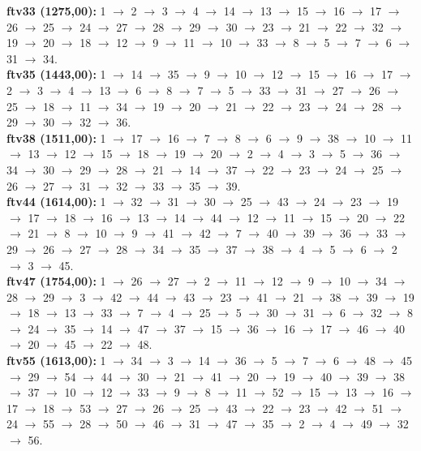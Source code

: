 \documentclass[10pt,a4paper]{article}
\begin{document}
\textbf{ftv33 (1275,00):} 1 $\to$ 2 $\to$ 3 $\to$ 4 $\to$ 14 $\to$ 13 $\to$ 15 $\to$ 16 $\to$ 17 $\to$ 26 $\to$ 25 $\to$ 24 $\to$ 27 $\to$ 28 $\to$ 29 $\to$ 30 $\to$ 23 $\to$ 21 $\to$ 22 $\to$ 32 $\to$ 19 $\to$ 20 $\to$ 18 $\to$ 12 $\to$ 9 $\to$ 11 $\to$ 10 $\to$ 33 $\to$ 8 $\to$ 5 $\to$ 7 $\to$ 6 $\to$ 31 $\to$ 34. \\
\textbf{ftv35 (1443,00):} 1 $\to$ 14 $\to$ 35 $\to$ 9 $\to$ 10 $\to$ 12 $\to$ 15 $\to$ 16 $\to$ 17 $\to$ 2 $\to$ 3 $\to$ 4 $\to$ 13 $\to$ 6 $\to$ 8 $\to$ 7 $\to$ 5 $\to$ 33 $\to$ 31 $\to$ 27 $\to$ 26 $\to$ 25 $\to$ 18 $\to$ 11 $\to$ 34 $\to$ 19 $\to$ 20 $\to$ 21 $\to$ 22 $\to$ 23 $\to$ 24 $\to$ 28 $\to$ 29 $\to$ 30 $\to$ 32 $\to$ 36. \\
\textbf{ftv38 (1511,00):} 1 $\to$ 17 $\to$ 16 $\to$ 7 $\to$ 8 $\to$ 6 $\to$ 9 $\to$ 38 $\to$ 10 $\to$ 11 $\to$ 13 $\to$ 12 $\to$ 15 $\to$ 18 $\to$ 19 $\to$ 20 $\to$ 2 $\to$ 4 $\to$ 3 $\to$ 5 $\to$ 36 $\to$ 34 $\to$ 30 $\to$ 29 $\to$ 28 $\to$ 21 $\to$ 14 $\to$ 37 $\to$ 22 $\to$ 23 $\to$ 24 $\to$ 25 $\to$ 26 $\to$ 27 $\to$ 31 $\to$ 32 $\to$ 33 $\to$ 35 $\to$ 39. \\
\textbf{ftv44 (1614,00):} 1 $\to$ 32 $\to$ 31 $\to$ 30 $\to$ 25 $\to$ 43 $\to$ 24 $\to$ 23 $\to$ 19 $\to$ 17 $\to$ 18 $\to$ 16 $\to$ 13 $\to$ 14 $\to$ 44 $\to$ 12 $\to$ 11 $\to$ 15 $\to$ 20 $\to$ 22 $\to$ 21 $\to$ 8 $\to$ 10 $\to$ 9 $\to$ 41 $\to$ 42 $\to$ 7 $\to$ 40 $\to$ 39 $\to$ 36 $\to$ 33 $\to$ 29 $\to$ 26 $\to$ 27 $\to$ 28 $\to$ 34 $\to$ 35 $\to$ 37 $\to$ 38 $\to$ 4 $\to$ 5 $\to$ 6 $\to$ 2 $\to$ 3 $\to$ 45. \\
\textbf{ftv47 (1754,00):} 1 $\to$ 26 $\to$ 27 $\to$ 2 $\to$ 11 $\to$ 12 $\to$ 9 $\to$ 10 $\to$ 34 $\to$ 28 $\to$ 29 $\to$ 3 $\to$ 42 $\to$ 44 $\to$ 43 $\to$ 23 $\to$ 41 $\to$ 21 $\to$ 38 $\to$ 39 $\to$ 19 $\to$ 18 $\to$ 13 $\to$ 33 $\to$ 7 $\to$ 4 $\to$ 25 $\to$ 5 $\to$ 30 $\to$ 31 $\to$ 6 $\to$ 32 $\to$ 8 $\to$ 24 $\to$ 35 $\to$ 14 $\to$ 47 $\to$ 37 $\to$ 15 $\to$ 36 $\to$ 16 $\to$ 17 $\to$ 46 $\to$ 40 $\to$ 20 $\to$ 45 $\to$ 22 $\to$ 48. \\
\textbf{ftv55 (1613,00):} 1 $\to$ 34 $\to$ 3 $\to$ 14 $\to$ 36 $\to$ 5 $\to$ 7 $\to$ 6 $\to$ 48 $\to$ 45 $\to$ 29 $\to$ 54 $\to$ 44 $\to$ 30 $\to$ 21 $\to$ 41 $\to$ 20 $\to$ 19 $\to$ 40 $\to$ 39 $\to$ 38 $\to$ 37 $\to$ 10 $\to$ 12 $\to$ 33 $\to$ 9 $\to$ 8 $\to$ 11 $\to$ 52 $\to$ 15 $\to$ 13 $\to$ 16 $\to$ 17 $\to$ 18 $\to$ 53 $\to$ 27 $\to$ 26 $\to$ 25 $\to$ 43 $\to$ 22 $\to$ 23 $\to$ 42 $\to$ 51 $\to$ 24 $\to$ 55 $\to$ 28 $\to$ 50 $\to$ 46 $\to$ 31 $\to$ 47 $\to$ 35 $\to$ 2 $\to$ 4 $\to$ 49 $\to$ 32 $\to$ 56. \\
\end{document}
